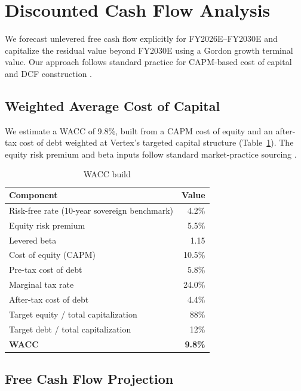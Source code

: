 \section{Discounted Cash Flow Analysis}

We forecast unlevered free cash flow explicitly for FY2026E--FY2030E and capitalize the residual value beyond FY2030E using a Gordon growth terminal value. Our approach follows standard practice for CAPM-based cost of capital and DCF construction \citep{damodaran2012,koller2020}.

\subsection{Weighted Average Cost of Capital}

We estimate a WACC of 9.8\%, built from a CAPM cost of equity and an after-tax cost of debt weighted at Vertex's targeted capital structure (Table~\ref{tab:wacc}). The equity risk premium and beta inputs follow standard market-practice sourcing \citep{sharpe1964,fama1993,duffphelps2026}.

\begin{table}[H]
\centering
\small
\caption{WACC build}
\label{tab:wacc}
\begin{tabular}{@{}lr@{}}
\toprule
\textbf{Component} & \textbf{Value} \\
\midrule
Risk-free rate (10-year sovereign benchmark) & 4.2\% \\
Equity risk premium & 5.5\% \\
Levered beta & 1.15 \\
Cost of equity (CAPM) & 10.5\% \\
\addlinespace
Pre-tax cost of debt & 5.8\% \\
Marginal tax rate & 24.0\% \\
After-tax cost of debt & 4.4\% \\
\addlinespace
Target equity / total capitalization & 88\% \\
Target debt / total capitalization & 12\% \\
\midrule
\textbf{WACC} & \textbf{9.8\%} \\
\bottomrule
\end{tabular}
\end{table}

\subsection{Free Cash Flow Projection}

